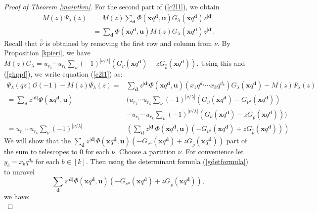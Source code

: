 \documentclass[12pt]{article}
\newcommand{\OC}{\mathcal{O}}
\theoremstyle{plain}
\theoremstyle{definition}
\newcommand{\xb}{\boldsymbol{x}}
\newcommand{\ub}{\boldsymbol{u}}
\begin{document}
\begin{proof}[Proof of Theorem \ref{mainthm}]
For the second part of (\ref{c2l1}), we obtain
\begin{align*}
    M(z)\Psi_\lambda(z) &= M(z)\sum \limits_{\boldsymbol{d}} \Phi(\xb q^{\boldsymbol{d}},\ub)G_\lambda\left(\xb q^{\boldsymbol{d}}\right)z^{|\boldsymbol{d}|}\\
    &=\sum \limits_{\boldsymbol{d}} \Phi(\xb q^{\boldsymbol{d}},\ub)M(z)G_\lambda\left(\xb q^{\boldsymbol{d}}\right)z^{|\boldsymbol{d}|}.
\end{align*}
Recall that $\hat{\overline{\nu}}$ is obtained by removing the first row and column from $\nu$.
By Proposition \ref{kpieri}, we have $M(z)G_\lambda= u_{r_1}\cdots u_{r_k} \sum_\nu (-1)^{|\nu/\lambda|} (G_\nu (\xb q^{\boldsymbol{d}})-zG_{\hat{\overline{\nu}}}(\xb q^{\boldsymbol{d}})).$ Using this and (\ref{gkppf}), we write equation (\ref{c2l1}) as: 
\begin{align*}
    \Psi_\lambda(qz) \OC(-1) - M(z)\Psi_\lambda(z)
     =& \sum \limits_{\boldsymbol{d}} z^{|\boldsymbol{d}|}\Phi(\xb q^{\boldsymbol{d}},\ub) \left( x_1q^{d_1}\cdots x_kq^{d_k}\right)G_{\lambda} \left( \xb q^{\boldsymbol{d}}\right) -M(z)\Psi_\lambda(z)\\
     = \sum \limits_{\boldsymbol{d}}  z^{|\boldsymbol{d}|}\Phi(\xb q^{\boldsymbol{d}},\ub) &\bigg({u_{r_1}\cdots u_{r_k}}\sum \limits_\nu (-1)^{|\nu/\lambda|} (G_{\nu}(\xb q^{\boldsymbol{d}})- G_{\nu^a}(\xb q^{\boldsymbol{d}}) ) \\
     &     -{u_{r_1}\cdots u_{r_k}} \sum \limits_\nu (-1)^{|\nu/\lambda|} (G_\nu(\xb q^{\boldsymbol{d}}) - z G_{\hat{\overline{\nu}}}(\xb q^{\boldsymbol{d}}))\bigg)\\
    ={u_{r_1}\cdots u_{r_k}} \sum_\nu (-1)^{|\nu/\lambda|}  &\left(\sum_{\boldsymbol{d}} z^{|\boldsymbol{d}|}\Phi(\xb q^{\boldsymbol{d}},\ub)\left(-G_{\nu^a}(\xb q^{\boldsymbol{d}}) +z G_{\hat{\overline{\nu}}}(\xb q^{\boldsymbol{d}})\right)\right)
\end{align*}
We will show that the $ \sum_{\boldsymbol{d}} z^{|\boldsymbol{d}|}\Phi(\xb q^{\boldsymbol{d}},\ub)\left(-G_{\nu^a}(\xb q^{\boldsymbol{d}}) +z G_{\hat{\overline{\nu}}}(\xb q^{\boldsymbol{d}})\right)$ part of the sum to telescopes to 0 for each $\nu$. Choose a partition $\nu$. For convenience let $y_b=x_bq^{d_b}$ for each $b\in [k]$. Then using the determinant formula (\ref{gdetformula}) to unravel 
$$
\sum_{\boldsymbol{d}} z^{|\boldsymbol{d}|}\Phi(\xb q^{\boldsymbol{d}},\ub)\left(-G_{\nu^a}(\xb q^{\boldsymbol{d}}) +z G_{\hat{\overline{\nu}}}(\xb q^{\boldsymbol{d}})\right),
$$
we have:
\begin{equation} \label{detfirst}

\end{equation}
\end{proof}
\end{document}
